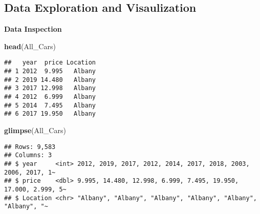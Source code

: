 \documentclass[
]{article}
\newenvironment{Shaded}{\begin{snugshade}}{\end{snugshade}}
\newcommand{\AttributeTok}[1]{\textcolor[rgb]{0.13,0.29,0.53}{#1}}
\newcommand{\CommentTok}[1]{\textcolor[rgb]{0.56,0.35,0.01}{\textit{#1}}}
\newcommand{\FunctionTok}[1]{\textcolor[rgb]{0.13,0.29,0.53}{\textbf{#1}}}
\newcommand{\NormalTok}[1]{#1}
\newcommand{\OtherTok}[1]{\textcolor[rgb]{0.56,0.35,0.01}{#1}}
\newcommand{\SpecialCharTok}[1]{\textcolor[rgb]{0.81,0.36,0.00}{\textbf{#1}}}
\newcommand{\StringTok}[1]{\textcolor[rgb]{0.31,0.60,0.02}{#1}}
\begin{document}
\begin{Shaded}
\end{Shaded}

\hypertarget{data-exploration-and-visaulization}{%
\subsection{Data Exploration and
Visaulization}\label{data-exploration-and-visaulization}}

\textbf{Data Inspection}

\begin{Shaded}
\begin{Highlighting}[]
\FunctionTok{head}\NormalTok{(All\_Cars)}
\end{Highlighting}
\end{Shaded}

\begin{verbatim}
##   year  price Location
## 1 2012  9.995   Albany
## 2 2019 14.480   Albany
## 3 2017 12.998   Albany
## 4 2012  6.999   Albany
## 5 2014  7.495   Albany
## 6 2017 19.950   Albany
\end{verbatim}

\begin{Shaded}
\begin{Highlighting}[]
\FunctionTok{glimpse}\NormalTok{(All\_Cars)}
\end{Highlighting}
\end{Shaded}

\begin{verbatim}
## Rows: 9,583
## Columns: 3
## $ year     <int> 2012, 2019, 2017, 2012, 2014, 2017, 2018, 2003, 2006, 2017, 1~
## $ price    <dbl> 9.995, 14.480, 12.998, 6.999, 7.495, 19.950, 17.000, 2.999, 5~
## $ Location <chr> "Albany", "Albany", "Albany", "Albany", "Albany", "Albany", "~
\end{verbatim}
\end{document}
